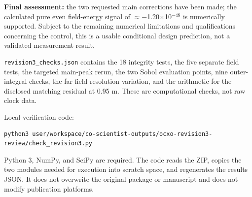 \documentclass[10pt,a4paper]{article}
\begin{document}
{\textbf{Final assessment:} the two requested main corrections have been made; the calculated pure even field-energy signal of $\approx$$-$1.20$\times$10$^{-48}$ is numerically supported. Subject to the remaining numerical limitations and qualifications concerning the control, this is a usable conditional design prediction, not a validated measurement result.
\par
\vspace{2pt}\par\vspace{0.5pt}
\par
\texttt{revision3\_checks.json} contains the 18 integrity tests, the five separate field tests, the targeted main-peak rerun, the two Sobol evaluation points, nine outer-integral checks, the far-field resolution variation, and the arithmetic for the disclosed matching residual at 0.95 m. These are computational checks, not raw clock data.
\par
Local verification code:
\par
\begin{verbatim}
python3 user/workspace/co-scientist-outputs/ocxo-revision3-review/check_revision3.py
\end{verbatim}
\par
Python 3, NumPy, and SciPy are required. The code reads the ZIP, copies the two modules needed for execution into scratch space, and regenerates the results JSON. It does not overwrite the original package or manuscript and does not modify publication platforms.
}
\end{document}
